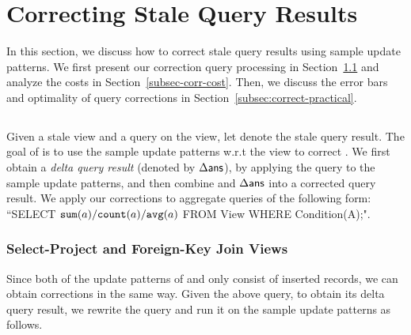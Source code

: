 
\section{Correcting Stale Query Results}
\label{correction}
In this section, we discuss how to correct stale query results using sample update patterns. We first present our correction query processing in Section~\ref{subsec:correct-principle} and analyze the costs in Section~\ref{subsec-corr-cost}. Then, we discuss the error bars and optimality of query corrections in Section~\ref{subsec:correct-practical}.


\subsection{\Cqp}\label{subsec:correct-principle}
Given a stale view and a query on the view, let \ans denote the stale query result. The goal of \cqp is to use the sample update patterns w.r.t the view to correct \ans. We first obtain a \emph{delta query result} (denoted by $\Delta\textsf{ans}$), by applying the query to the sample update patterns, and then combine \ans and $\Delta\textsf{ans}$ into a corrected query result. We apply our corrections to aggregate queries of the following form: ``SELECT $\texttt{sum} (a)/\texttt{count}(a)/\texttt{avg} (a)$ FROM View WHERE Condition(A);".








\subsubsection{Select-Project and Foreign-Key Join Views} \label{subsubsec:correct-spfj}
Since both of the update patterns of \spview and \fjview only consist of inserted records, we can obtain corrections in the same way. Given the above query, to obtain its delta query result, we rewrite the query and run it on the sample update patterns as follows.  

\vspace{-.25em}

